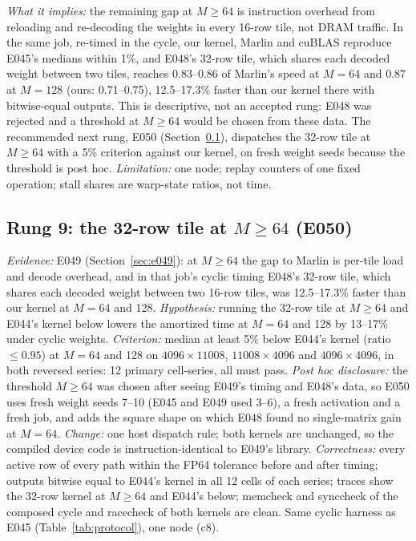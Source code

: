 \documentclass[sigconf,nonacm]{acmart}
\begin{document}
\emph{What it implies:} the remaining gap at $M \ge 64$ is instruction overhead from reloading and re-decoding the weights in every 16-row tile, not DRAM traffic. In the same job, re-timed in the cycle, our kernel, Marlin and cuBLAS reproduce E045's medians within 1\%, and E048's 32-row tile, which shares each decoded weight between two tiles, reaches 0.83--0.86 of Marlin's speed at $M=64$ and 0.87 at $M=128$ (ours: 0.71--0.75), 12.5--17.3\% faster than our kernel there with bitwise-equal outputs. This is descriptive, not an accepted rung: E048 was rejected and a threshold at $M \ge 64$ would be chosen from these data. The recommended next rung, E050 (Section~\ref{sec:e050}), dispatches the 32-row tile at $M \ge 64$ with a 5\% criterion against our kernel, on fresh weight seeds because the threshold is post hoc. \emph{Limitation:} one node; replay counters of one fixed operation; stall shares are warp-state ratios, not time.

\subsection{Rung 9: the 32-row tile at $M \ge 64$ (E050)}
\label{sec:e050}
\emph{Evidence:} E049 (Section~\ref{sec:e049}): at $M \ge 64$ the gap to Marlin is per-tile load and decode overhead, and in that job's cyclic timing E048's 32-row tile, which shares each decoded weight between two 16-row tiles, was 12.5--17.3\% faster than our kernel at $M=64$ and 128. \emph{Hypothesis:} running the 32-row tile at $M \ge 64$ and E044's kernel below lowers the amortized time at $M=64$ and 128 by 13--17\% under cyclic weights. \emph{Criterion:} median at least 5\% below E044's kernel (ratio $\le 0.95$) at $M=64$ and 128 on $4096\times11008$, $11008\times4096$ and $4096\times4096$, in both reversed series: 12 primary cell-series, all must pass. \emph{Post hoc disclosure:} the threshold $M \ge 64$ was chosen after seeing E049's timing and E048's data, so E050 uses fresh weight seeds 7--10 (E045 and E049 used 3--6), a fresh activation and a fresh job, and adds the square shape on which E048 found no single-matrix gain at $M=64$. \emph{Change:} one host dispatch rule; both kernels are unchanged, so the compiled device code is instruction-identical to E049's library. \emph{Correctness:} every active row of every path within the FP64 tolerance before and after timing; outputs bitwise equal to E044's kernel in all 12 cells of each series; traces show the 32-row kernel at $M \ge 64$ and E044's below; memcheck and synccheck of the composed cycle and racecheck of both kernels are clean. Same cyclic harness as E045 (Table~\ref{tab:protocol}), one node (c8).
\end{document}
